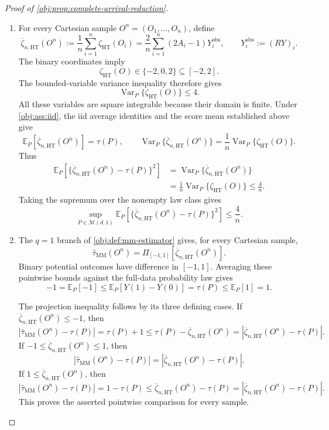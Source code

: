 \begin{proof}[Proof of \cref{obj:prop:complete-arrival-reduction}]
\begin{enumerate}
\item For every Cartesian sample \(O^n=(O_1,\ldots,O_n)\), define
\[
\overline\zeta_{n,\mathrm{HT}}(O^n)
:=
\frac1n\sum_{i=1}^{n}\zeta_{\mathrm{HT}}(O_i)
=
\frac2n\sum_{i=1}^{n}(2A_i-1)Y_i^{\mathrm{obs}},
\qquad
Y_i^{\mathrm{obs}}:=(RY)_i.
\]
The binary coordinates imply
\[
\zeta_{\mathrm{HT}}(O)\in\{-2,0,2\}\subseteq[-2,2].
\]
The bounded-variable variance inequality therefore gives
\[
\operatorname{Var}_P\{\zeta_{\mathrm{HT}}(O)\}\le4.
\]
All these variables are square integrable because their domain is finite. Under \cref{obj:ass:iid}, the iid average identities and the score mean established above give
\[
\mathbb E_P[\overline\zeta_{n,\mathrm{HT}}(O^n)]=\tau(P),
\qquad
\operatorname{Var}_P\{\overline\zeta_{n,\mathrm{HT}}(O^n)\}
=
\frac1n\operatorname{Var}_P\{\zeta_{\mathrm{HT}}(O)\}.
\]
Thus
\[
\begin{aligned}
\mathbb E_P\!\left[
\{\overline\zeta_{n,\mathrm{HT}}(O^n)-\tau(P)\}^{2}
\right]
&=\operatorname{Var}_P\{\overline\zeta_{n,\mathrm{HT}}(O^n)\}\\
&=\frac1n\operatorname{Var}_P\{\zeta_{\mathrm{HT}}(O)\}
\le\frac4n.
\end{aligned}
\]
Taking the supremum over the nonempty law class gives
\[
\sup_{P\in\mathcal M(d,1)}
\mathbb E_P\!\left[
\{\overline\zeta_{n,\mathrm{HT}}(O^n)-\tau(P)\}^{2}
\right]
\le\frac4n.
\]

\item The \(q=1\) branch of \cref{obj:def:mm-estimator} gives, for every Cartesian sample,
\[
\widehat\tau_{\mathrm{MM}}(O^n)
=
\Pi_{[-1,1]}\!\left[\overline\zeta_{n,\mathrm{HT}}(O^n)\right].
\]
Binary potential outcomes have difference in \([-1,1]\). Averaging these pointwise bounds against the full-data probability law gives
\[
-1=\mathbb E_P[-1]
\le \mathbb E_P[Y(1)-Y(0)]
=\tau(P)
\le\mathbb E_P[1]=1.
\]

The projection inequality follows by its three defining cases. If
\(\overline\zeta_{n,\mathrm{HT}}(O^n)\le-1\), then
\[
\left|\widehat\tau_{\mathrm{MM}}(O^n)-\tau(P)\right|
=\tau(P)+1
\le\tau(P)-\overline\zeta_{n,\mathrm{HT}}(O^n)
=
\left|\overline\zeta_{n,\mathrm{HT}}(O^n)-\tau(P)\right|.
\]
If \(-1\le\overline\zeta_{n,\mathrm{HT}}(O^n)\le1\), then
\[
\left|\widehat\tau_{\mathrm{MM}}(O^n)-\tau(P)\right|
=
\left|\overline\zeta_{n,\mathrm{HT}}(O^n)-\tau(P)\right|.
\]
If \(1\le\overline\zeta_{n,\mathrm{HT}}(O^n)\), then
\[
\left|\widehat\tau_{\mathrm{MM}}(O^n)-\tau(P)\right|
=1-\tau(P)
\le\overline\zeta_{n,\mathrm{HT}}(O^n)-\tau(P)
=
\left|\overline\zeta_{n,\mathrm{HT}}(O^n)-\tau(P)\right|.
\]
This proves the asserted pointwise comparison for every sample.


\end{enumerate}
\end{proof}
